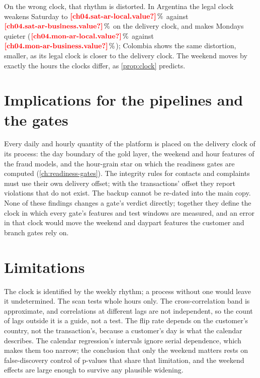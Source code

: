 On the wrong clock, that rhythm is distorted. In Argentina the legal clock weakens Saturday to
$\est{ch04.sat-ar-local}{value}\,\%$ against $\est{ch04.sat-ar-business}{value}\,\%$ on the delivery clock, and makes
Mondays quieter ($\est{ch04.mon-ar-local}{value}\,\%$ against $\est{ch04.mon-ar-business}{value}\,\%$); Colombia shows
the same distortion, smaller, as its legal clock is closer to the delivery clock. The weekend moves by exactly the hours
the clocks differ, as \cref{prop:clock} predicts.

\section{Implications for the pipelines and the gates}\label{sec:time-implications}

Every daily and hourly quantity of the platform is placed on the delivery clock of its process: the day boundary
of the gold layer, the weekend and hour features of the fraud models, and the hour-grain star on which the readiness
gates are computed (\cref{ch:readiness-gates}). The integrity rules for contacts and complaints must use their own
delivery offset; with the transactions' offset they report violations that do not exist. The backup cannot be
re-dated into the main copy. None of these findings changes a gate's verdict directly; together they define the clock
in which every gate's features and test windows are measured, and an error in that clock would move the weekend and
daypart features the customer and branch gates rely on.

\section{Limitations}\label{sec:time-limits}

The clock is identified by the weekly rhythm; a process without one would leave it undetermined. The scan tests whole
hours only. The cross-correlation band is approximate, and correlations at different lags are not independent, so the
count of lags outside it is a guide, not a test. The flip rate depends on the customer's country, not the transaction's,
because a customer's day is what the calendar describes. The calendar regression's intervals ignore serial dependence,
which makes them too narrow; the conclusion that only the weekend matters rests on false-discovery control of p-values
that share that limitation, and the weekend effects are large enough to survive any plausible widening.
